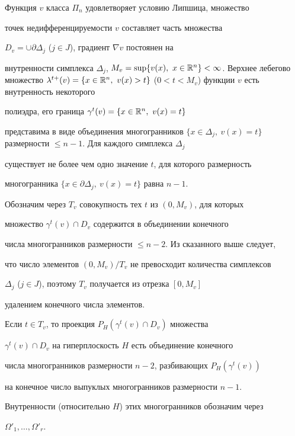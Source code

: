  


Функция $v$ класса $\Pi_n$ удовлетворяет условию Липшица, множество 


точек недифференцируемости $v$ составляет часть множества 


$D_v=\cup\partial\Delta_j$ ($j\in J$), градиент $\nabla v$ постоянен на 


внутренности симплекса $\Delta_j$, $M_v=\sup\{v(x),\ x\in\Bbb 


R^n\}<\infty$. Верхнее лебегово множество $\lambda^{t+}(v)=\{x\in\Bbb 


R^n,\ v(x)>t\}$ ($0<t<M_v$) функции $v$ есть внутренность некоторого 


полиэдра, его граница $\gamma^t(v)=\{x\in\Bbb R^n,\ v(x)=t\}$ 


представима в виде объединения многогранников $\{x\in\Delta_j,\ 


v(x)=t\}$ размерности $\le n-1$. Для каждого симплекса $\Delta_j$ 


существует не более чем одно значение $t$, для которого размерность 


многогранника $\{x\in\partial\Delta_j,\ v(x)=t\}$ равна $n-1$. 


Обозначим через $T_v$ совокупность тех $t$ из $(0,M_v)$, для которых 


множество $\gamma^t(v)\cap D_v$ содержится в объединении конечного 


числа многогранников размерности $\le n-2$. Из сказанного выше следует, 


что число элементов $(0,M_v)/T_v$ не превосходит количества симплексов 


$\Delta_j$ ($j\in J$), поэтому $T_v$ получается из отрезка $[0,M_v]$ 


удалением конечного числа элементов. 


 


Если $t\in T_v$, то проекция $P_H(\gamma^t(v)\cap D_v)$ множества 


$\gamma^t(v)\cap D_v$ на гиперплоскость $H$ есть объединение конечного 


числа многогранников размерности $n-2$, разбивающих $P_H(\gamma^t(v))$ 


на конечное число выпуклых многогранников размерности $n-1$. 


Внутренности (относительно $H$) этих многогранников обозначим через 


$\Omega'_1,\dotsc,\Omega'_r$. 


